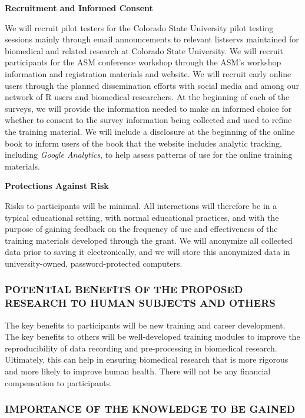 \documentclass[pdftex,english,11.5pt,parskip=half]{scrartcl}
\begin{document}
\textbf{Recruitment and Informed Consent}

We will recruit pilot testers for the Colorado State University pilot testing sessions mainly through email announcements to relevant listservs maintained for biomedical and related research at Colorado State University. We will recruit participants for the ASM conference workshop through the ASM's workshop information and registration materials and website. We will recruit early online users through the planned dissemination efforts with social media and among our network of R users and biomedical researchers. At the beginning of each of the surveys, we will provide the information needed to make an
informed choice for whether to consent to the survey information being collected and
used to refine the training material. We will include a disclosure at the beginning of 
the online book to inform users of the book that the website includes analytic 
tracking, including \textit{Google Analytics}, to help assess patterns of use for the 
online training materials.

\textbf{Protections Against Risk}

Risks to participants will be minimal. 
All interactions will therefore be in a typical educational setting, with normal educational practices, and with the purpose of gaining feedback on the frequency of use and effectiveness of the training materials developed through the grant.
We will anonymize all collected data prior to saving it electronically, and we will 
store this anonymized data in university-owned, password-protected computers.

\subsubsection*{POTENTIAL BENEFITS OF THE PROPOSED RESEARCH TO HUMAN SUBJECTS AND OTHERS}

The key benefits to participants will be new training and career development. The 
key benefits to others will be well-developed training modules to improve the 
reproducibility of data recording and pre-processing in biomedical research. 
Ultimately, this can help in ensuring biomedical research that is more 
rigorous and more likely to improve human health. There will not be any 
financial compensation to participants.

\subsubsection*{IMPORTANCE OF THE KNOWLEDGE TO BE GAINED}
\end{document}
